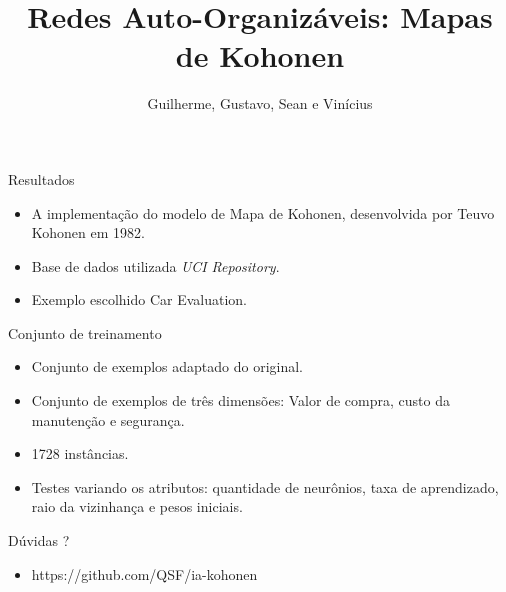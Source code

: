\documentclass{beamer}
\title{Redes Auto-Organizáveis: Mapas de Kohonen}
\author{Guilherme, Gustavo, Sean e Vinícius}
\institute{Universidade Estadual de Londrina}
\begin{document}
\frame{\titlepage}



\begin{frame}{Resultados}
	\begin{itemize}
	  \item A implementação do modelo de Mapa de Kohonen, desenvolvida por Teuvo Kohonen em 1982.
	  \item Base de dados utilizada \textit{UCI Repository}.
	  \item Exemplo escolhido Car Evaluation.
	\end{itemize}
\end{frame}

\begin{frame}{Conjunto de treinamento}
	\begin{itemize}
	  \item Conjunto de exemplos adaptado do original. 
	  \item Conjunto de exemplos de três dimensões: Valor de compra, custo da manutenção e segurança.
	  \item 1728 instâncias.
	  \item Testes variando os atributos: quantidade de neurônios, taxa de aprendizado, raio da vizinhança e pesos iniciais.
	\end{itemize}
\end{frame}

\begin{frame}{Dúvidas ?}
	\begin{itemize}
	  \item https://github.com/QSF/ia-kohonen
	\end{itemize}
\end{frame}
\end{document}
